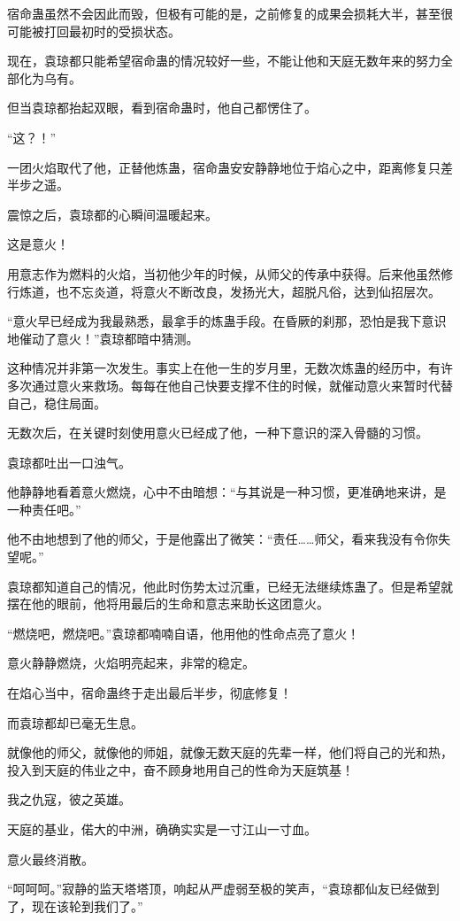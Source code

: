 \begin{this_body}
宿命蛊虽然不会因此而毁，但极有可能的是，之前修复的成果会损耗大半，甚至很可能被打回最初时的受损状态。

现在，袁琼都只能希望宿命蛊的情况较好一些，不能让他和天庭无数年来的努力全部化为乌有。

但当袁琼都抬起双眼，看到宿命蛊时，他自己都愣住了。

“这？！”

一团火焰取代了他，正替他炼蛊，宿命蛊安安静静地位于焰心之中，距离修复只差半步之遥。

震惊之后，袁琼都的心瞬间温暖起来。

这是意火！

用意志作为燃料的火焰，当初他少年的时候，从师父的传承中获得。后来他虽然修行炼道，也不忘炎道，将意火不断改良，发扬光大，超脱凡俗，达到仙招层次。

“意火早已经成为我最熟悉，最拿手的炼蛊手段。在昏厥的刹那，恐怕是我下意识地催动了意火！”袁琼都暗中猜测。

这种情况并非第一次发生。事实上在他一生的岁月里，无数次炼蛊的经历中，有许多次通过意火来救场。每每在他自己快要支撑不住的时候，就催动意火来暂时代替自己，稳住局面。

无数次后，在关键时刻使用意火已经成了他，一种下意识的深入骨髓的习惯。

袁琼都吐出一口浊气。

他静静地看着意火燃烧，心中不由暗想：“与其说是一种习惯，更准确地来讲，是一种责任吧。”

他不由地想到了他的师父，于是他露出了微笑：“责任……师父，看来我没有令你失望呢。”

袁琼都知道自己的情况，他此时伤势太过沉重，已经无法继续炼蛊了。但是希望就摆在他的眼前，他将用最后的生命和意志来助长这团意火。

“燃烧吧，燃烧吧。”袁琼都喃喃自语，他用他的性命点亮了意火！

意火静静燃烧，火焰明亮起来，非常的稳定。

在焰心当中，宿命蛊终于走出最后半步，彻底修复！

而袁琼都却已毫无生息。

就像他的师父，就像他的师姐，就像无数天庭的先辈一样，他们将自己的光和热，投入到天庭的伟业之中，奋不顾身地用自己的性命为天庭筑基！

我之仇寇，彼之英雄。

天庭的基业，偌大的中洲，确确实实是一寸江山一寸血。

意火最终消散。

“呵呵呵。”寂静的监天塔塔顶，响起从严虚弱至极的笑声，“袁琼都仙友已经做到了，现在该轮到我们了。”


\end{this_body}

